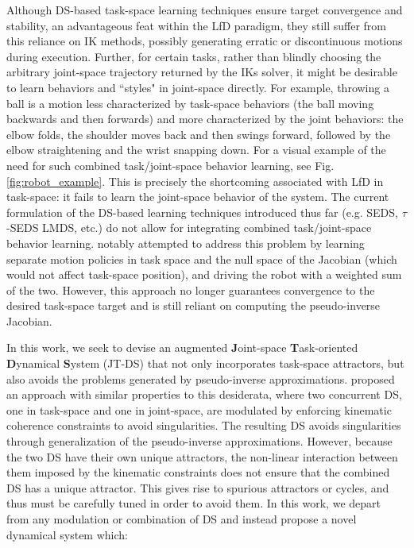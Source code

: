 \documentclass[letterpaper, 10 pt, conference,fleqn]{ieeeconf}
\begin{document}
Although DS-based task-space learning techniques ensure target convergence and stability, an advantageous feat within the LfD paradigm, they still suffer from this reliance on IK methods, possibly generating erratic or discontinuous motions during execution. Further, for certain tasks, rather than blindly choosing the arbitrary joint-space trajectory returned by the IKs solver, it might be desirable to learn behaviors and ``styles" in joint-space directly.  For example, throwing a ball is a motion less characterized by task-space behaviors (the ball moving backwards and then forwards) and more characterized by the joint behaviors: the elbow folds, the shoulder moves back and then swings forward, followed by the elbow straightening and the wrist snapping down. For a visual example of the need for such combined task/joint-space behavior learning, see Fig. \ref{fig:robot_example}. This is precisely the shortcoming associated with LfD in task-space: it fails to learn the joint-space behavior of the system. The current formulation of the DS-based learning techniques introduced thus far (e.g. SEDS, $\tau$-SEDS LMDS, etc.) do not allow for integrating combined task/joint-space behavior learning. \cite{calinon2008probabilistic} notably attempted to address this problem by learning separate motion policies in task space and the null space of the Jacobian (which would not affect task-space position), and driving the robot with a weighted sum of the two. However, this approach no longer guarantees convergence to the desired task-space target and is still reliant on computing the pseudo-inverse Jacobian. 


In this work, we seek to devise an augmented \textbf{J}oint-space \textbf{T}ask-oriented \textbf{D}ynamical \textbf{S}ystem (JT-DS) that not only incorporates task-space attractors, but also avoids the problems generated by pseudo-inverse approximations. \cite{hersch2008reaching} proposed an approach with similar properties to this desiderata, where two concurrent DS, one in task-space and one in joint-space, are modulated by enforcing kinematic coherence constraints to avoid singularities. The resulting DS avoids singularities through generalization of the pseudo-inverse approximations. However, because the two DS have their own unique attractors, the non-linear interaction between them imposed by the kinematic constraints does not ensure that the combined DS has a unique attractor. This gives rise to spurious attractors or cycles, and thus must be carefully tuned in order to avoid them. In this work, we depart from any modulation or combination of DS and instead propose a novel dynamical system which:
\end{document}
